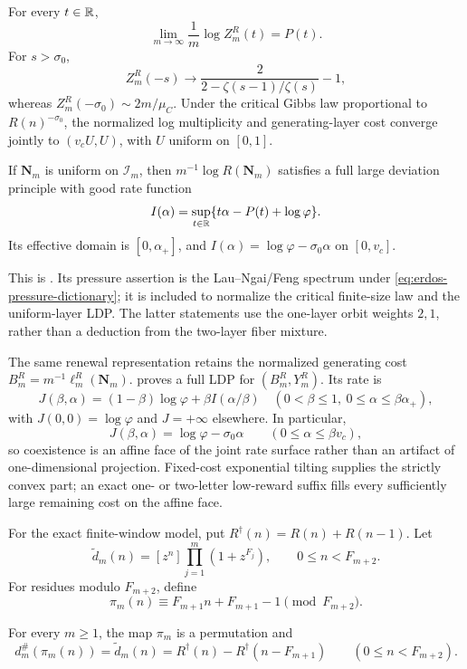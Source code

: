 \begin{theoremB}
For every \(t\in\mathbb{R}\),
\[
 \lim_{m\to\infty}\frac1m\log Z_m^R(t)=P(t).
\]
For \(s>\sigma_0\),
\[
 Z_m^R(-s)\longrightarrow
 \frac2{2-\zeta(s-1)/\zeta(s)}-1,
\]
whereas \(Z_m^R(-\sigma_0)\sim2m/\mu_C\).  Under the critical Gibbs law
proportional to \(R(n)^{-\sigma_0}\), the normalized log multiplicity and
generating-layer cost converge jointly to \((v_cU,U)\), with \(U\) uniform on
\([0,1]\).

If \(\mathbf N_m\) is uniform on \(\mathcal I_m\), then
\(m^{-1}\log R(\mathbf N_m)\) satisfies a full large deviation principle
with good rate function
\[
 I(\alpha)=\sup_{t\in\mathbb{R}}\{t\alpha-P(t)+\log\varphi\}.
\]
Its effective domain is \([0,\alpha_+]\), and
\(I(\alpha)=\log\varphi-\sigma_0\alpha\) on \([0,v_c]\).
\end{theoremB}

This is .  Its pressure assertion
is the Lau--Ngai/Feng spectrum under
\eqref{eq:erdos-pressure-dictionary}; it is included to normalize the critical
finite-size law and the uniform-layer LDP.  The latter statements use the
one-layer orbit weights \(2,1\), rather than a deduction from the two-layer
fiber mixture.

The same renewal representation retains the normalized generating cost
\(B_m^R=m^{-1}\ell_m^R(\mathbf N_m)\).
 proves a full LDP for
\((B_m^R,Y_m^R)\).  Its rate is
\[
 J(\beta,\alpha)=
 (1-\beta)\log\varphi+\beta I(\alpha/\beta)
 \quad(0<\beta\le1,\ 0\le\alpha\le\beta\alpha_+),
\]
with \(J(0,0)=\log\varphi\) and \(J=+\infty\) elsewhere.  In particular,
\[
 J(\beta,\alpha)=\log\varphi-\sigma_0\alpha
 \qquad(0\le\alpha\le\beta v_c),
\]
so coexistence is an affine face of the joint rate surface rather than an
artifact of one-dimensional projection.  Fixed-cost exponential tilting
supplies the strictly convex part; an exact one- or two-letter low-reward
suffix fills every sufficiently large remaining cost on the affine face.

For the exact finite-window model, put
\(R^\dagger(n)=R(n)+R(n-1)\).  Let
\[
  \widetilde d_m(n)=[z^n]\prod_{j=1}^m(1+z^{F_j}),
  \qquad 0\le n<F_{m+2}.
\]
For residues modulo \(F_{m+2}\), define
\[
  \pi_m(n)\equiv F_{m+1}n+F_{m+1}-1\pmod{F_{m+2}}.
\]

\begin{theoremC}
For every \(m\ge1\), the map \(\pi_m\) is a permutation and
\[
  d_m^\#(\pi_m(n))
  =\widetilde d_m(n)
  =R^\dagger(n)-R^\dagger(n-F_{m+1})
  \qquad(0\le n<F_{m+2}).
\]
\end{theoremC}

